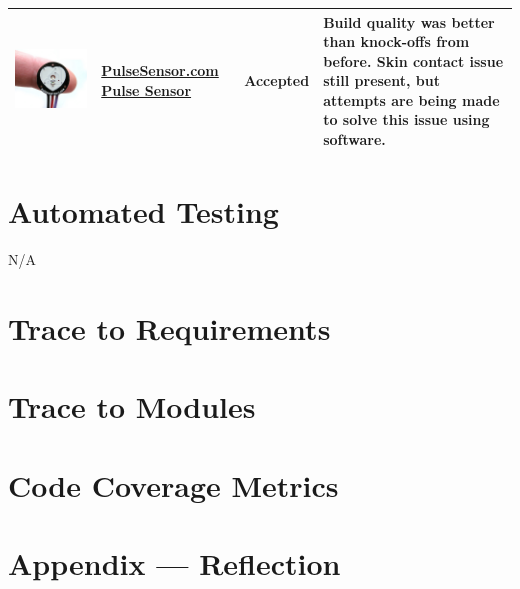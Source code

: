 \documentclass[12pt, titlepage]{article}
\begin{document}
\begin{table}[H]
\begin{tabular}{ | c | m{3cm} | c | m{7cm} |}
\includegraphics[scale = 0.25]{pulseSensor} & \href{https://pulsesensor.com/}{PulseSensor.com Pulse Sensor}  & Accepted & Build quality was better than knock-offs from before. Skin contact issue still present, but attempts are being made to solve this issue using software.\\
\hline
\end{tabular}
\end{table}

\section{Automated Testing}
N/A

\section{Trace to Requirements}
		
\section{Trace to Modules}		

\section{Code Coverage Metrics}

%
%

\newpage{}
\section*{Appendix --- Reflection}
\end{document}
